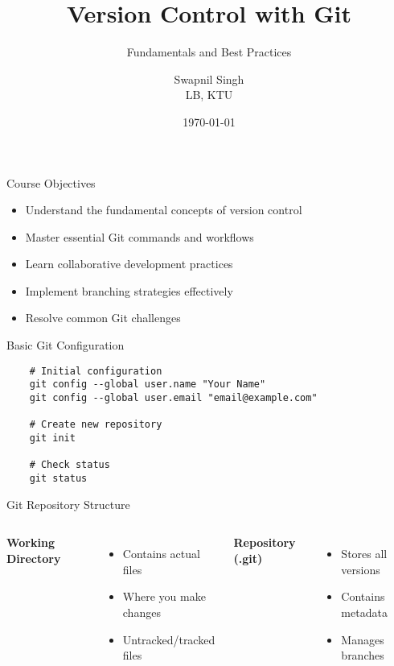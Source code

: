 \documentclass[10pt]{beamer}
\title{Version Control with Git}
\subtitle{Fundamentals and Best Practices}
\author{Swapnil Singh\\LB, KTU}
\date{\today}
\begin{document}
\begin{frame}
    \titlepage
\end{frame}

\begin{frame}{Course Objectives}
    \begin{itemize}
        \item Understand the fundamental concepts of version control
        \item Master essential Git commands and workflows
        \item Learn collaborative development practices
        \item Implement branching strategies effectively
        \item Resolve common Git challenges
    \end{itemize}
\end{frame}

\begin{frame}[fragile]{Basic Git Configuration}
    \begin{verbatim}
    # Initial configuration
    git config --global user.name "Your Name"
    git config --global user.email "email@example.com"
    
    # Create new repository
    git init
    
    # Check status
    git status
    \end{verbatim}
\end{frame}

\begin{frame}{Git Repository Structure}
    \begin{columns}
        \textbf{Working Directory}
        \begin{itemize}
            \item Contains actual files
            \item Where you make changes
            \item Untracked/tracked files
        \end{itemize}
        
        \textbf{Repository (.git)}
        \begin{itemize}
            \item Stores all versions
            \item Contains metadata
            \item Manages branches
        \end{itemize}
    \end{columns}
\end{frame}
\end{document}
